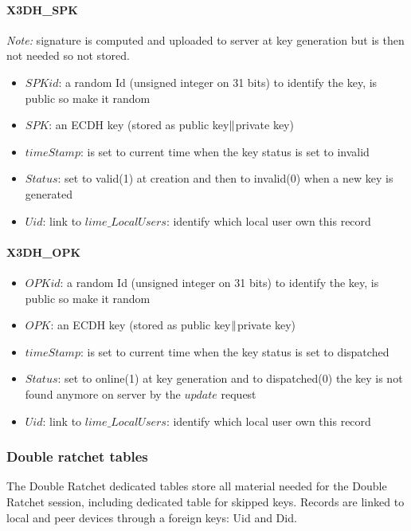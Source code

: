\documentclass[a4paper,11pt]{article}
\begin{document}
    \paragraph*{X3DH\_SPK}
    \textit{Note:} signature is computed and uploaded to server at key generation but is then not needed so not stored.
    \begin{itemize}
      \item $SPKid$: a random Id (unsigned integer on 31 bits) to identify the key, is public so make it random
      \item $SPK$: an ECDH key (stored as public key$\Arrowvert $private key)
      \item $timeStamp$: is set to current time when the key status is set to invalid
      \item $Status$: set to valid(1) at creation and then to invalid(0) when a new key is generated
      \item $Uid$: link to $lime\_LocalUsers$: identify which local user own this record
    \end{itemize}
  
  \paragraph*{X3DH\_OPK}
    \begin{itemize}
      \item $OPKid$: a random Id (unsigned integer on 31 bits) to identify the key, is public so make it random
      \item $OPK$: an ECDH key (stored as public key$\Arrowvert $private key)
      \item $timeStamp$: is set to current time when the key status is set to dispatched
      \item $Status$: set to online(1) at key generation and to dispatched(0) the key is not found anymore on server by the $update$ request
      \item $Uid$: link to $lime\_LocalUsers$: identify which local user own this record
    \end{itemize}
              
    \subsubsection{Double ratchet tables}
    The Double Ratchet dedicated tables store all material needed for the Double Ratchet session, including dedicated table for skipped keys. Records are linked to local and peer devices through a foreign keys: Uid and Did.
\end{document}
